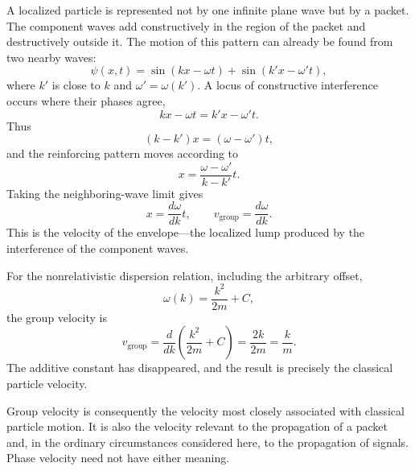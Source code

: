 A localized particle is represented not by one infinite plane wave but by a packet. The component waves add constructively in the region of the packet and destructively outside it. The motion of this pattern can already be found from two nearby waves:
\begin{equation}
\psi(x,t)=
\sin(kx-\omega t)+
\sin(k'x-\omega't),
\end{equation}
where \(k'\) is close to \(k\) and \(\omega'=\omega(k')\). A locus of constructive interference occurs where their phases agree,
\begin{equation}
kx-\omega t=k'x-\omega't.
\end{equation}
Thus
\begin{equation}
(k-k')x=(\omega-\omega')t,
\end{equation}
and the reinforcing pattern moves according to
\begin{equation}
x=\frac{\omega-\omega'}{k-k'}t.
\end{equation}
Taking the neighboring-wave limit gives
\begin{equation}
x=\frac{d\omega}{dk}t,
\qquad
v_{\mathrm{group}}=\frac{d\omega}{dk}.
\end{equation}
This is the velocity of the envelope---the localized lump produced by the interference of the component waves.

For the nonrelativistic dispersion relation, including the arbitrary offset,
\begin{equation}
\omega(k)=\frac{k^2}{2m}+C,
\end{equation}
the group velocity is
\begin{equation}
v_{\mathrm{group}}
=\frac{d}{dk}\left(\frac{k^2}{2m}+C\right)
=\frac{2k}{2m}
=\frac{k}{m}.
\end{equation}
The additive constant has disappeared, and the result is precisely the classical particle velocity.

\begin{classroomqa}
\end{classroomqa}

Group velocity is consequently the velocity most closely associated with classical particle motion. It is also the velocity relevant to the propagation of a packet and, in the ordinary circumstances considered here, to the propagation of signals. Phase velocity need not have either meaning.

